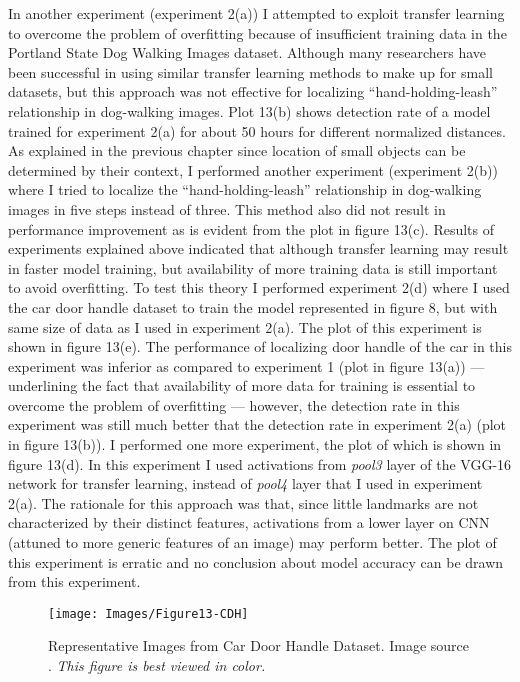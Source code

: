 \documentclass [11pt,letterpaper ,twoside ,openany ]{report}
\begin{document}
    In another experiment (experiment 2(a)) I attempted to exploit transfer learning to overcome the problem of overfitting because of insufficient training data in the Portland State Dog Walking Images dataset. Although many researchers \cite{oquab2014learning,ahmed2008training,collobert2011natural} have been successful in using similar transfer learning methods to make up for small datasets, but this approach was not effective for localizing ``hand-holding-leash'' relationship in dog-walking images. Plot 13(b) shows detection rate of a model trained for experiment 2(a) for about 50 hours for different normalized distances. As explained in the previous chapter since location of small objects can be determined by their context, I performed another experiment (experiment 2(b)) where I tried to localize the ``hand-holding-leash'' relationship in dog-walking images in five steps instead of three. This method also did not result in performance improvement as is evident from the plot in figure 13(c). Results of experiments explained above indicated that although transfer learning may result in faster model training, but availability of more training data is still important to avoid overfitting. To test this theory I performed experiment 2(d) where I used the car door handle dataset to train the model represented in figure 8, but with same size of data as I used in experiment 2(a). The plot of this experiment is shown in figure 13(e). The performance of localizing door handle of the car in this experiment was inferior as compared to experiment 1 (plot in figure 13(a)) --- underlining the fact that availability of more data for training is essential to overcome the problem of overfitting --- however, the detection rate in this experiment was still much better that the detection rate in experiment 2(a) (plot in figure 13(b)). I performed one more experiment, the plot of which is shown in figure 13(d). In this experiment I used activations from \textit{pool3} layer of the VGG-16 network for transfer learning, instead of \textit{pool4} layer that I used in experiment 2(a). The rationale for this approach was that, since little landmarks are not characterized by their distinct features, activations from a lower layer on CNN (attuned to more generic features of an image) may perform better. The plot of this experiment is erratic and no conclusion about model accuracy can be drawn from this experiment. 

    \begin{figure}[b!]
      \centering
      \texttt{[image: Images/Figure13-CDH]}
      \caption{Representative Images from Car Door Handle Dataset. Image source \cite{Singh_2016_CVPR}. \textit{This figure is best viewed in color.}}
      \label{fig:cdh}
    \end{figure}        
\end{document}
